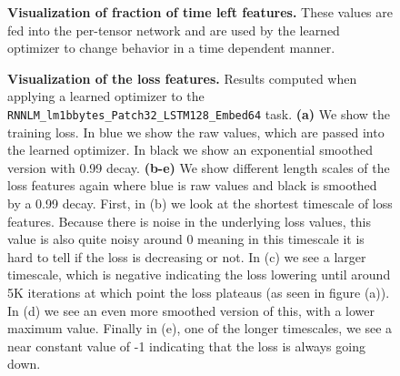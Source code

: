 \documentclass[11pt]{article}
\begin{document}
\begin{figure}
    \centering
    \caption{\textbf{Visualization of fraction of time left features.} These values are fed into the per-tensor network and are used by the learned optimizer to change behavior in a time dependent manner.  \label{app:fig:fraction_left}
    }
\end{figure}


\begin{figure}
    \centering
    \caption{\textbf{Visualization of the loss features.} Results computed when applying a learned optimizer to the \texttt{RNNLM\_lm1bbytes\_Patch32\_LSTM128\_Embed64} task. \textbf{(a)} We show the training loss. In blue we show the raw values, which are passed into the learned optimizer. In black we show an exponential smoothed version with 0.99 decay. \textbf{(b-e)} We show different length scales of the loss features again where blue is raw values and black is smoothed by a 0.99 decay. First, in (b) we look at the shortest timescale of loss features. Because there is noise in the underlying loss values, this value is also quite noisy around 0 meaning in this timescale it is hard to tell if the loss is decreasing or not. In (c) we see a larger timescale, which is negative indicating the loss lowering until around 5K iterations at which point the loss plateaus (as seen in figure (a)). In (d) we see an even more smoothed version of this, with a lower maximum value. Finally in (e), one of the longer timescales, we see a near constant value of -1 indicating that the loss is always going down. \label{app:fig:loss_features}
    }
\end{figure}
\end{document}
